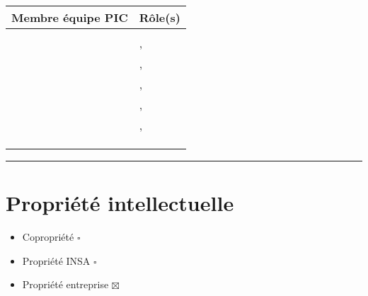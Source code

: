 	
	\begin{tabular}[h]{|p{}|p{}|}
	\hline
	
	\cellcolor{gray!40}Membre équipe PIC & \cellcolor{gray!40}Rôle(s) \\\hline
	\Sergi & \CP \\\hline
	\Pierre & \CPA , \RQ \\\hline
	\Michel & \D , \RD \\\hline 
	\Kafui  & \D , \RQA \\\hline
	\Matthieu & \D , \RRS \\\hline
	\Mathieu & \D , \RGC \\\hline
	\Melissa  & \D \\\hline
	\Julie & \D \\\hline
	\Florian & \D \\\hline
	
\end{tabular}
	
	\vspace{1cm}
	\noindent\hfil\rule{\textwidth}{.4pt}\hfil
	\vspace{1cm}	
	
	\section*{Propriété intellectuelle}
		\begin{itemize}
			\item Copropriété $\square$
			\item Propriété INSA $\square$
			\item Propriété entreprise $\boxtimes$
		\end{itemize}
	
		
